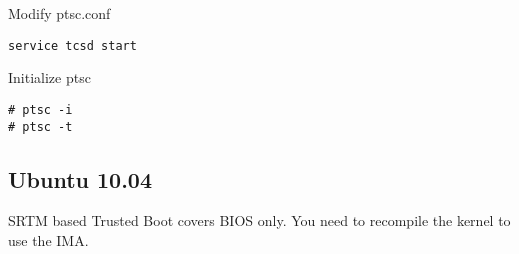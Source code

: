Modify ptsc.conf
\begin{lstlisting}[style=source_code]
service tcsd start
\end{lstlisting}
Initialize ptsc
\begin{lstlisting}[style=source_code]
# ptsc -i
# ptsc -t
\end{lstlisting}


\subsection{Ubuntu 10.04} 

SRTM based Trusted Boot covers BIOS only.
You need to recompile the kernel to use the IMA.


